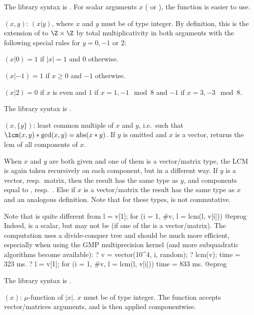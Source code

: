The library syntax is .
For scalar arguments $x$ ( or ), the function
 is easier to use.

$(x,y)$: \label{se:kronecker}
 $(x|y)$, where $x$ and $y$ must be of type integer. By
definition, this is the extension of  to $\Z \times \Z$
by total multiplicativity in both arguments with the following special rules
for $y = 0, -1$ or $2$:

\item $(x|0) = 1$ if $|x| = 1$ and $0$ otherwise.

\item $(x|-1) = 1$ if $x \geq 0$ and $-1$ otherwise.

\item $(x|2) = 0$ if $x$ is even and $1$ if $x = 1,-1 \mod 8$ and $-1$
if $x=3,-3 \mod 8$.

The library syntax is .

$(x,\{y\})$: \label{se:lcm}least common multiple of $x$ and $y$, i.e.~such
that $\lcm(x,y)*\gcd(x,y) = \text{abs}(x*y)$. If $y$ is omitted and $x$
is a vector, returns the $\text{lcm}$ of all components of $x$.

When $x$ and $y$ are both given and one of them is a vector/matrix type,
the LCM is again taken recursively on each component, but in a different way.
If $y$ is a vector, resp.~matrix, then the result has the same type as $y$,
and components equal to , resp.~. Else
if $x$ is a vector/matrix the result has the same type as $x$ and an
analogous definition. Note that for these types,  is not
commutative.

Note that  is quite different from
\bprog
l = v[1]; for (i = 1, #v, l = lcm(l, v[i]))
@eprog\noindent
Indeed,  is a scalar, but  may not be (if one of
the  is a vector/matrix). The computation uses a divide-conquer tree
and should be much more efficient, especially when using the GMP
multiprecision kernel (and more subquadratic algorithms become available):
\bprog
? v = vector(10^4, i, random);
? lcm(v);
time = 323 ms.
? l = v[1]; for (i = 1, #v, l = lcm(l, v[i]))
time = 833 ms.
@eprog

The library syntax is .

$(x)$: \label{se:moebius} $\mu$-function of $|x|$. $x$ must be of type integer.
The function accepts vector/matrices arguments, and is then applied
componentwise.

